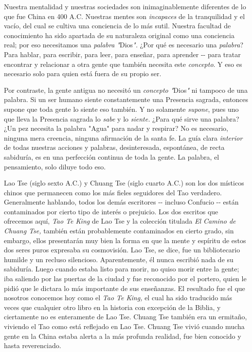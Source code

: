 Nuestra mentalidad y nuestras sociedades son inimaginablemente
diferentes de lo que fue China en 400 A.C. Nuestras mentes son
\emph{incapaces} de la tranquilidad y el vacío, del cual se cultiva una
conciencia de lo más sutil. Nuestra facultad de conocimiento ha sido
apartada de su naturaleza original como una conciencia real; por eso
necesitamos una \emph{palabra "}Dios\emph{".} ¿Por qué es necesario una
\emph{palabra}? Para hablar, para escribir, para leer, para enseñar,
para aprender -\/- para tratar encontrar y relacionar a otra gente que
también necesita este \emph{concepto}. Y eso es necesario solo para
quien está fuera de su propio ser.

Por contraste, la gente antigua no necesitó un \emph{concepto
"}Dios\emph{"} ni tampoco de una palabra. Si un ser humano siente
constantemente una Presencia sagrada, entonces supone que toda gente lo
siente eso también. Y no solamente \emph{supone}, pues uno que lleva la
Presencia sagrada lo \emph{sabe} y lo \emph{siente.} ¿Para qué sirve una
palabra? ¿Un pez necesita la palabra "Agua" para nadar y respirar? No es
necesario, ninguna mera creencia, ninguna afirmación de la santa fe. La
guía clara \emph{interior} de todas nuestras acciones y palabras,
desinteresada, espontánea, de recta sabiduría, es en una perfección
continua de toda la gente. La palabra, el pensamiento, solo diluye todo
eso.

Lao Tse (siglo sexto A.C.) y Chuang Tse (siglo cuarto A.C.) son los dos
místicos chinos que permanecen como los más fieles seguidores del Tao
verdadero. Generalmente hablando, todos los demás escritores -\/-
incluso Confucio -\/- están contaminados por cierto tipo de interés o
prejuicio. Los dos escritos que ofrecemos aquí, \emph{Tao Te King} de
Lao Tse y la colección titulada \emph{El Camino de Chuang Tse,} también
están probablemente contaminados en cierto grado, sin embargo, ellos
presentarán muy bien la forma en que la mente y espíritu de estos dos
seres puros expresaba su cosmovisión. Lao Tse, se dice, fue un
bibliotecario humilde y un recluso silencioso. Aparentemente, él nunca
escribió nada de su sabiduría. Luego cuando estaba listo para morir, no
quiso morir entre la gente; iba saliendo por las puertas de la ciudad y
fue reconocido por el portero, quien le pidió que le dictara lo más
importante de sus enseñanzas. El resultado fue el que nosotros conocemos
hoy como el \emph{Tao Te King,} el cual ha sido traducido más veces que
cualquier otro libro en la historia con excepción de la Biblia, y
ciertamente no es enteramente de Lao Tse. Chuang Tse también era un
ermitaño, viviendo el Tao como está reflejado en Lao Tse. Chuang Tse
vivió cuando mucha gente en la China estaba alerta a la más profunda
realidad, fue bien conocido y hasta reverenciado.

